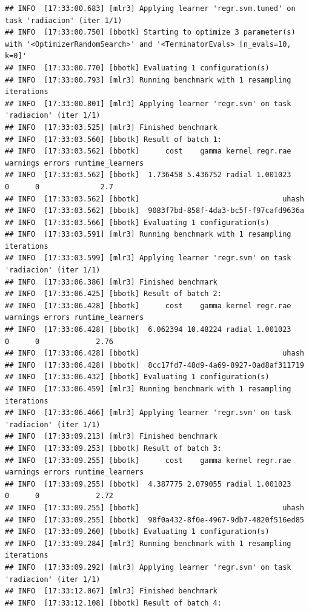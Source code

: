 \documentclass[
  11pt,
  a4paper,
]{article}
\begin{document}
\begin{verbatim}
## INFO  [17:33:00.683] [mlr3] Applying learner 'regr.svm.tuned' on task 'radiacion' (iter 1/1)
## INFO  [17:33:00.750] [bbotk] Starting to optimize 3 parameter(s) with '<OptimizerRandomSearch>' and '<TerminatorEvals> [n_evals=10, k=0]'
## INFO  [17:33:00.770] [bbotk] Evaluating 1 configuration(s)
## INFO  [17:33:00.793] [mlr3] Running benchmark with 1 resampling iterations
## INFO  [17:33:00.801] [mlr3] Applying learner 'regr.svm' on task 'radiacion' (iter 1/1)
## INFO  [17:33:03.525] [mlr3] Finished benchmark
## INFO  [17:33:03.560] [bbotk] Result of batch 1:
## INFO  [17:33:03.562] [bbotk]      cost    gamma kernel regr.rae warnings errors runtime_learners
## INFO  [17:33:03.562] [bbotk]  1.736458 5.436752 radial 1.001023        0      0              2.7
## INFO  [17:33:03.562] [bbotk]                                 uhash
## INFO  [17:33:03.562] [bbotk]  9083f7bd-858f-4da3-bc5f-f97cafd9636a
## INFO  [17:33:03.566] [bbotk] Evaluating 1 configuration(s)
## INFO  [17:33:03.591] [mlr3] Running benchmark with 1 resampling iterations
## INFO  [17:33:03.599] [mlr3] Applying learner 'regr.svm' on task 'radiacion' (iter 1/1)
## INFO  [17:33:06.386] [mlr3] Finished benchmark
## INFO  [17:33:06.425] [bbotk] Result of batch 2:
## INFO  [17:33:06.428] [bbotk]      cost    gamma kernel regr.rae warnings errors runtime_learners
## INFO  [17:33:06.428] [bbotk]  6.062394 10.48224 radial 1.001023        0      0             2.76
## INFO  [17:33:06.428] [bbotk]                                 uhash
## INFO  [17:33:06.428] [bbotk]  8cc17fd7-48d9-4a69-8927-0ad8af311719
## INFO  [17:33:06.432] [bbotk] Evaluating 1 configuration(s)
## INFO  [17:33:06.459] [mlr3] Running benchmark with 1 resampling iterations
## INFO  [17:33:06.466] [mlr3] Applying learner 'regr.svm' on task 'radiacion' (iter 1/1)
## INFO  [17:33:09.213] [mlr3] Finished benchmark
## INFO  [17:33:09.253] [bbotk] Result of batch 3:
## INFO  [17:33:09.255] [bbotk]      cost    gamma kernel regr.rae warnings errors runtime_learners
## INFO  [17:33:09.255] [bbotk]  4.387775 2.079055 radial 1.001023        0      0             2.72
## INFO  [17:33:09.255] [bbotk]                                 uhash
## INFO  [17:33:09.255] [bbotk]  98f0a432-8f0e-4967-9db7-4820f516ed85
## INFO  [17:33:09.260] [bbotk] Evaluating 1 configuration(s)
## INFO  [17:33:09.284] [mlr3] Running benchmark with 1 resampling iterations
## INFO  [17:33:09.292] [mlr3] Applying learner 'regr.svm' on task 'radiacion' (iter 1/1)
## INFO  [17:33:12.067] [mlr3] Finished benchmark
## INFO  [17:33:12.108] [bbotk] Result of batch 4:

\end{verbatim}
\end{document}
